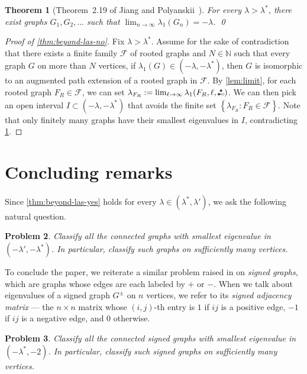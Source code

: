 \documentclass[11pt]{article}
\newtheorem{theorem}{Theorem}[section]
\newtheorem{problem}[theorem]{Problem}
\theoremstyle{definition}
\theoremstyle{remark}
\newcommand{\dset}[2]{\left\{{#1}\colon{#2}\right\}}
\newcommand{\la}{\lambda}
\newcommand{\las}{\lambda^*}
\newcommand{\F}{\mathcal{F}}
\newcommand{\N}{\mathbb{N}}
\newcommand{\etwo}{\tikz[baseline=-0.2ex, scale=0.9]{\draw[darkgray, thick] (0,0)--(0.2,0); \draw[darkgray, fill=darkgray] (0,0) circle (0.05); \draw[darkgray, fill=darkgray] (0.1,0.17320508075) circle (0.05); \draw[darkgray, fill=white] (0.2,0) circle (0.05);}}
\newcommand{\ape}[1]{(#1,\etwo)}
\begin{document}
\begin{theorem}[Theorem~2.19 of Jiang and Polyanskii~\cite{JP25}] \label{thm:dense}
    For every $\la > \las$, there exist graphs $G_1, G_2, \dots$ such that $\lim_{n\to\infty} \la_1(G_n) = -\la$. \qed
\end{theorem}

\begin{proof}[Proof of \cref{thm:beyond-las-no}]
    Fix $\la > \las$. Assume for the sake of contradiction that there exists a finite family $\F$ of rooted graphs and $N \in \N$ such that every graph $G$ on more than $N$ vertices, if $\la_1(G) \in (-\la,-\las)$, then $G$ is isomorphic to an augmented path extension of a rooted graph in $\F$. By \cref{lem:limit}, for each rooted graph $F_R \in \F$, we can set $\la_{F_R} := \lim_{\ell\to\infty}\la_1\ape{F_R,\ell}$. We can then pick an open interval $I \subset (-\la, -\las)$ that avoids the finite set $\dset{\la_{F_R}}{F_R \in \F}$. Note that only finitely many graphs have their smallest eigenvalues in $I$, contradicting \cref{thm:dense}.
\end{proof}

\section{Concluding remarks} \label{sec:remarks}

Since \cref{thm:beyond-las-yes} holds for every $\la \in (\las, \la')$, we ask the following natural question.

\begin{problem}
    Classify all the connected graphs with smallest eigenvalue in $(-\la',-\las)$. In particular, classify such graphs on sufficiently many vertices.
\end{problem}

To conclude the paper, we reiterate a similar problem raised in \cite{JP25} on \emph{signed graphs}, which are graphs whose edges are each labeled by $+$ or $-$. When we talk about eigenvalues of a signed graph $G^\pm$ on $n$ vertices, we refer to its \emph{signed adjacency matrix} --- the $n \times n$ matrix whose $(i,j)$-th entry is $1$ if $ij$ is a positive edge, $-1$ if $ij$ is a negative edge, and $0$ otherwise.

\begin{problem}
    Classify all the connected signed graphs with smallest eigenvalue in $(-\las,-2)$. In particular, classify such signed graphs on sufficiently many vertices.
\end{problem}
\end{document}
